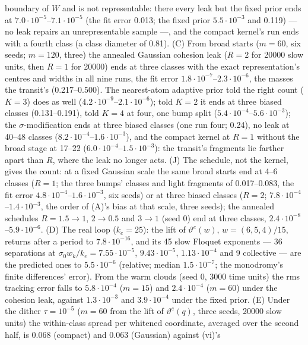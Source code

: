 \begin{sloppypar}
boundary of $W$ and is not representable: there every leak but the fixed prior ends at
$7.0\cdot10^{-5}$--$7.1\cdot10^{-5}$ (the fit error 0.013; the fixed prior $5.5\cdot10^{-3}$ and 0.119) --- no leak
repairs an unrepresentable sample ---, and the compact kernel's run ends with a fourth class (a class diameter of
0.81). (C) From broad starts ($m = 60$, six seeds; $m = 120$, three) the annealed Gaussian cohesion leak ($R = 2$ for
20000 slow units, then $R = 1$ for 20000) ends at three classes with the exact representation's centres and widths in
all nine runs, the fit error $1.8\cdot10^{-7}$--$2.3\cdot10^{-6}$, the masses the transit's (0.217--0.500). The
nearest-atom adaptive prior told the right count ($K = 3$) does as well ($4.2\cdot10^{-9}$--$2.1\cdot10^{-6}$); told
$K = 2$ it ends at three biased classes (0.131--0.191), told $K = 4$ at four, one bump split
($5.4\cdot10^{-4}$--$5.6\cdot10^{-3}$); the $\sigma$-modification ends at three biased classes (one run four; 0.24),
no leak at 40--48 classes ($8.2\cdot10^{-4}$--$1.6\cdot10^{-3}$), and the compact kernel at $R = 1$ without the broad
stage at 17--22 ($6.0\cdot10^{-4}$--$1.5\cdot10^{-3}$): the transit's fragments lie farther apart than $R$, where the
leak no longer acts. (J) The schedule, not the kernel, gives the count: at a fixed Gaussian scale the same broad starts
end at 4--6 classes ($R = 1$; the three bumps' classes and light fragments of 0.017--0.083, the fit error
$4.8\cdot10^{-4}$--$1.6\cdot10^{-3}$, six seeds) or at three biased classes ($R = 2$;
$7.8\cdot10^{-4}$--$1.4\cdot10^{-3}$, the order of (A)'s bias at that scale, three seeds); the annealed schedules
$R = 1.5\to1$, $2\to0.5$ and $3\to1$ (seed 0) end at three classes, $2.4\cdot10^{-8}$--$5.9\cdot10^{-6}$. (D) The real
loop ($k_e = 25$): the lift of $\vartheta^e(w)$, $w = (6,5,4)/15$, returns after a period to $7.8\cdot10^{-16}$, and
its 45 slow Floquet exponents --- 36 separations at $\sigma_0w_k/k_e = 7.55\cdot10^{-5}$, $9.43\cdot10^{-5}$,
$1.13\cdot10^{-4}$ and 9 collective --- are the predicted ones to $5.5\cdot10^{-6}$ (relative; median
$1.5\cdot10^{-7}$; the monodromy's finite differences' error). From the warm clouds (seed 0, 3000 time units) the rms
tracking error falls to $5.8\cdot10^{-4}$ ($m = 15$) and $2.4\cdot10^{-4}$ ($m = 60$) under the cohesion leak, against
$1.3\cdot10^{-3}$ and $3.9\cdot10^{-4}$ under the fixed prior. (E) Under the dither $\tau = 10^{-5}$ ($m = 60$ from the
lift of $\vartheta^e(q)$, three seeds, 20000 slow units) the within-class spread per whitened coordinate, averaged
over the second half, is 0.068 (compact) and 0.063 (Gaussian) against (vi)'s

\end{sloppypar}

